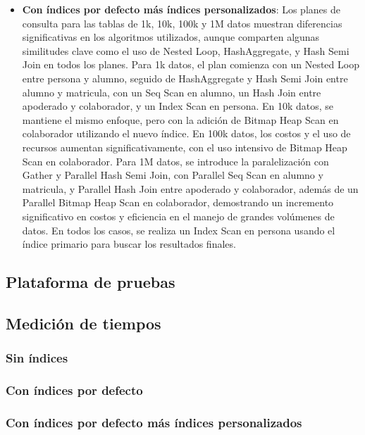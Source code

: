 \begin{itemize}
\begin{itemize}
		      \item {\textbf{Con índices por defecto más índices personalizados}: Los planes de consulta para las tablas de 1k, 10k, 100k y 1M datos muestran diferencias significativas en los algoritmos utilizados, aunque comparten algunas similitudes clave como el uso de Nested Loop, HashAggregate, y Hash Semi Join en todos los planes. Para 1k datos, el plan comienza con un Nested Loop entre persona y alumno, seguido de HashAggregate y Hash Semi Join entre alumno y matricula, con un Seq Scan en alumno, un Hash Join entre apoderado y colaborador, y un Index Scan en persona. En 10k datos, se mantiene el mismo enfoque, pero con la adición de Bitmap Heap Scan en colaborador utilizando el nuevo índice. En 100k datos, los costos y el uso de recursos aumentan significativamente, con el uso intensivo de Bitmap Heap Scan en colaborador. Para 1M datos, se introduce la paralelización con Gather y Parallel Hash Semi Join, con Parallel Seq Scan en alumno y matricula, y Parallel Hash Join entre apoderado y colaborador, además de un Parallel Bitmap Heap Scan en colaborador, demostrando un incremento significativo en costos y eficiencia en el manejo de grandes volúmenes de datos. En todos los casos, se realiza un Index Scan en persona usando el índice primario para buscar los resultados finales.}
	      \end{itemize}
\end{itemize}
\subsection{Plataforma de pruebas}

\subsection{Medición de tiempos}
\subsubsection{Sin índices}

\subsubsection{Con índices por defecto}

\subsubsection{Con índices por defecto más índices personalizados}

